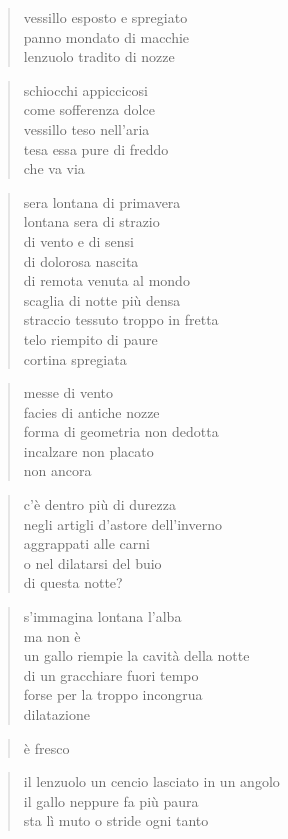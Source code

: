 	\begin{verse}
		vessillo esposto e spregiato\\
		panno mondato di macchie\\
		lenzuolo tradito di nozze
	\end{verse}

	\begin{verse}
		schiocchi appiccicosi\\
		come sofferenza dolce\\
		vessillo teso nell'aria\\
		tesa essa pure di freddo\\
		che va via
	\end{verse}

	\begin{verse}
		sera lontana di primavera\\
		lontana sera di strazio\\
		di vento e di sensi\\
		di dolorosa nascita\\
		di remota venuta al mondo\\
		scaglia di notte più densa\\
		straccio tessuto troppo in fretta\\
		telo riempito di paure\\
		cortina spregiata
	\end{verse}

	\begin{verse}
		messe di vento\\
		facies di antiche nozze\\
		forma di geometria non dedotta\\
		incalzare non placato\\
		non ancora
	\end{verse}

\clearpage


	\begin{verse}
		c’è dentro più di durezza\\
		negli artigli d'astore dell'inverno\\
		aggrappati alle carni\\
		o nel dilatarsi del buio\\
		di questa notte?
	\end{verse}

	\begin{verse}
		s'immagina lontana l'alba\\
		ma non è\\
		un gallo riempie la cavità della notte\\
		di un gracchiare fuori tempo\\
		forse per la troppo incongrua\\
		dilatazione
	\end{verse}

	\begin{verse}
		è fresco
	\end{verse}

	\begin{verse}
		il lenzuolo un cencio lasciato in un angolo\\
		il gallo neppure fa più paura\\
		sta lì muto o stride ogni tanto
	\end{verse}
